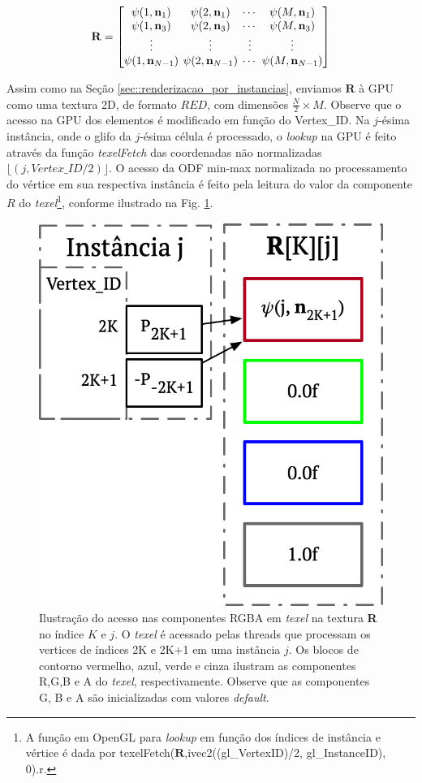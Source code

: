 \documentclass[
    12pt,                %
    oneside,            %
    a4paper,            %
    english,            %
    french,                %
    spanish,            %
    brazil                %
    ]{abntex2}
\begin{document}
\begin{equation}
\label{eq::odf_prototipo3}
\mathbf{R} = 
\begingroup %
\setlength\arraycolsep{2pt}
\begin{bmatrix} 
    \psi(1, \mathbf{n}_1) &
    \psi(2, \mathbf{n}_1) & \cdots & 
    \psi(M, \mathbf{n}_1)  \\
    
    \psi(1, \mathbf{n}_3) &
    \psi(2, \mathbf{n}_3) & \cdots & 
    \psi(M, \mathbf{n}_3) \\ \vdots & \vdots & \vdots & \vdots  \\
    
    \psi(1, \mathbf{n}_{N-1}) & 
    \psi(2, \mathbf{n}_{N-1}) & \cdots & 
    \psi(M, \mathbf{n}_{N-1})
\end{bmatrix}
\endgroup
\end{equation}

Assim como na Seção \ref{sec::renderizacao_por_instancias}, enviamos $\mathbf{R}$ à GPU como uma textura 2D, de formato $RED$, com dimensões $\frac{N}{2}\times M$. Observe que o acesso na GPU dos elementos é modificado em função do Vertex\_ID. Na $j$-ésima instância, onde o glifo da $j$-ésima célula é processado, o \textit{lookup} na GPU é feito através da função \textit{texelFetch} das coordenadas não normalizadas $\lfloor (j, Vertex\_ID/2)\rfloor$. O acesso da ODF min-max normalizada no processamento do vértice em sua respectiva instância é feito pela leitura do valor da componente $R$ do \textit{texel}\footnote{A função em OpenGL para \textit{lookup} em função dos índices de instância e vértice é dada por texelFetch($\mathbf{R}$,ivec2((gl\_VertexID)/2, gl\_InstanceID), 0).r.}, conforme ilustrado na Fig. \ref{fig::texelfetch_prototipo3}.

\begin{figure}[htb]
    \centering
    \includegraphics[width=.35\linewidth, angle=0]{figs/Renderizacao_glifos_evolucao/texellookup_RED_2.png}
    \caption{Ilustração do acesso nas componentes RGBA em \textit{texel} na textura \textbf{R} no índice $K$ e $j$. O \textit{texel} é acessado pelas threads que processam os vertices de índices 2K e 2K+1 em uma instância $j$. Os blocos de contorno vermelho, azul, verde e cinza ilustram as componentes R,G,B e A do \textit{texel}, respectivamente. Observe que as componentes G, B e A são inicializadas com valores \textit{default}.}
    \label{fig::texelfetch_prototipo3}
\end{figure}
\end{document}
